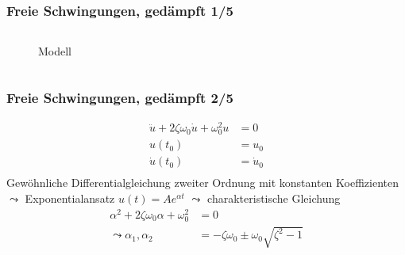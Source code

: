 \documentclass[hyperref={pdfpagemode=FullScreen, colorlinks=false}]{beamer}
\begin{document}
\begin{frame}
\frametitle{Freie Schwingungen, {\normalsize gedämpft 1/5}}

\begin{columns}
        \begin{column}[t]{.5\linewidth}
        \begin{figure}


\caption*{Modell }
\end{figure}
        \end{column}
		\hfill
		\begin{column}[t]{.5\linewidth}

		\end{column}
\end{columns}
\end{frame}


\begin{frame}
\frametitle{Freie Schwingungen, {\normalsize gedämpft 2/5}}
\begin{align*}
\ddot{u}+2 \zeta\omega_0\dot{u}+\omega_0^2 u&=0\\
u(t_0)&=u_0\\
\dot{u}(t_0)&=\dot{u}_0\\
\end{align*}
Gewöhnliche Differentialgleichung zweiter Ordnung mit konstanten Koeffizienten $\leadsto$ Exponentialansatz $u(t)=Ae^{\alpha t}$ $\leadsto$ charakteristische Gleichung
\begin{align*}
\alpha^2 + 2 \zeta\omega_0\alpha + \omega_0^2 &= 0 \\
\leadsto \alpha_{1}, \alpha_{2}&=- \zeta\omega_0\pm \omega_0\sqrt{ \zeta^2-1}
\end{align*}
\end{frame}
\end{document}
